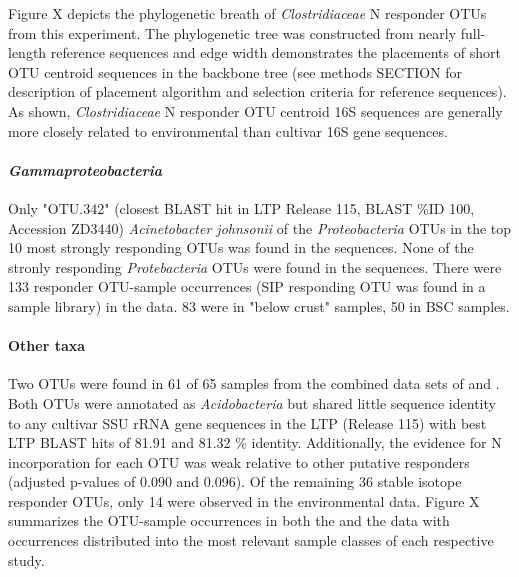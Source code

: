 Figure X depicts the phylogenetic breath of \textit{Clostridiaceae} N responder OTUs from this experiment. The phylogenetic tree was constructed from nearly full-length reference sequences and edge width demonstrates the placements of short OTU centroid sequences in the backbone tree (see methods SECTION for description of placement algorithm and selection criteria for reference sequences). As shown, \textit{Clostridiaceae} N responder OTU centroid 16S sequences are generally more closely related to environmental than cultivar 16S gene sequences.   

\paragraph{\textit{Gammaproteobacteria}}
Only "OTU.342" (closest BLAST hit in LTP Release 115, BLAST \%ID 100, Accession ZD3440) \textit{Acinetobacter johnsonii} of the \textit{Proteobacteria} OTUs in the top 10 most strongly responding OTUs was found in the \citet{Garcia_Pichel_2013} sequences. None of the stronly responding \textit{Protebacteria} OTUs were found in the \citet{Steven_2013} sequences. There were 133 responder OTU-sample occurrences (SIP responding OTU was found in a sample library) in the \citet{Steven_2013} data. 83 were in "below crust" samples, 50 in BSC samples.
\paragraph{Other taxa} 
Two OTUs were found in 61 of 65 samples from the combined data sets of \citet{Garcia_Pichel_2013} and \citet{Steven_2013}. Both OTUs were annotated as \textit{Acidobacteria} but shared little sequence identity to any cultivar SSU rRNA gene sequences in the LTP (Release 115) with best LTP BLAST hits of 81.91 and 81.32 \% identity. Additionally, the evidence for N incorporation for each OTU was weak relative to other putative responders (adjusted p-values of 0.090 and 0.096). Of the remaining 36 stable isotope responder OTUs, only 14 were observed in the environmental data. Figure X summarizes the OTU-sample occurrences in both the \citet{Steven_2013} and the \citet{Garcia_Pichel_2013} data with occurrences distributed into the most relevant sample classes of each respective study.

